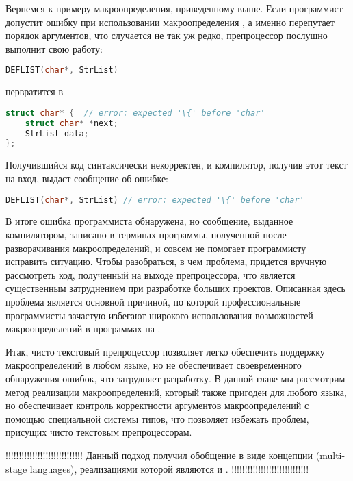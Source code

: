 Вернемся к примеру макроопределения, приведенному выше. Если программист допустит ошибку при использовании макроопределения , а именно перепутает порядок аргументов, что случается не так уж редко, препроцессор послушно выполнит свою работу:
\begin{lstlisting}[language=C]
DEFLIST(char*, StrList)
\end{lstlisting}
первратится в
\begin{lstlisting}[language=C]
struct char* {  // error: expected '\{' before 'char'
    struct char* *next; 
    StrList data; 
};
\end{lstlisting}
Получившийся код синтаксически некорректен, и компилятор, получив этот текст на вход, выдаст сообщение об ошибке:
\begin{lstlisting}[language=C]
DEFLIST(char*, StrList) // error: expected '\{' before 'char'
\end{lstlisting}
В итоге ошибка программиста обнаружена, но сообщение, выданное компилятором, записано в терминах программы, полученной после разворачивания макроопределений, и совсем не помогает программисту исправить ситуацию. Чтобы разобраться, в чем проблема, придется вручную рассмотреть код, полученный на выходе препроцессора, что является существенным затруднением при разработке больших проектов.
Описанная здесь проблема является основной причиной, по которой профессиональные программисты зачастую избегают широкого использования возможностей макроопределений в программах на  \cite{CodeComplete}. 

Итак, чисто текстовый препроцессор позволяет легко обеспечить поддержку макроопределений в любом языке, но не обеспечивает своевременного обнаружения ошибок, что затрудняет разработку. В данной главе мы рассмотрим метод реализации макроопределений, который также пригоден для любого языка, но обеспечивает контроль корректности аргументов макроопределений с помощью специальной системы типов, что позволяет избежать проблем, присущих чисто текстовым препроцессорам.

!!!!!!!!!!!!!!!!!!!!!!!!!!!!!
Данный подход получил обобщение в виде концепции  (multi-stage languages), реализациями которой являются  \cite{MacroML} и  \cite{HTMP}.
!!!!!!!!!!!!!!!!!!!!!!!!!!!!!


